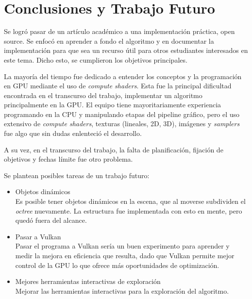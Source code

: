 \graphicspath{{chapters/6_conclusión/figures/}}



\chapter{Conclusiones y Trabajo Futuro}\label{chap:conclusions}

Se logró pasar de un artículo académico a una implementación práctica, open source.
Se enfocó en aprender a fondo el algoritmo y en documentar la implementación para que sea un recurso útil para otros estudiantes interesados en este tema.
Dicho esto, se cumplieron los objetivos principales.

La mayoría del tiempo fue dedicado a entender los conceptos y la programación en GPU mediante el uso de \textit{compute shaders}.
Esta fue la principal dificultad encontrada en el transcurso del trabajo, implementar un algoritmo principalmente en la GPU.
El equipo tiene mayoritariamente experiencia programando en la CPU y manipulando etapas del pipeline gráfico, pero el uso extensivo de \textit{compute shaders}, texturas (lineales, 2D, 3D), imágenes y \textit{samplers} fue algo que sin dudas enlenteció el desarrollo.

A su vez, en el transcurso del trabajo, la falta de planificación, fijación de objetivos y fechas límite fue otro problema.

Se plantean posibles tareas de un trabajo futuro:
\begin{itemize}
    \item Objetos dinámicos\\
        Es posible tener objetos dinámicos en la escena, que al moverse subdividen el \textit{octree} nuevamente.
        La estructura fue implementada con esto en mente, pero quedó fuera del alcance.
    \item Pasar a Vulkan\\
        Pasar el programa a Vulkan sería un buen experimento para aprender y medir la mejora en eficiencia que resulta, dado que Vulkan permite mejor control de la GPU lo que ofrece más oportunidades de optimización.
    \item Mejores herramientas interactivas de exploración\\
        Mejorar las herramientas interactivas para la exploración del algoritmo.
\end{itemize}
